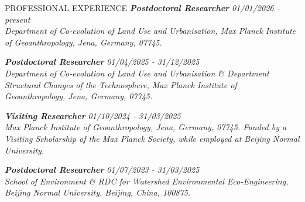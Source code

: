 \documentclass{resume} %
\newcommand{\employmententry}[3]{\textbf{\textit{#1}} \hfill {\em #2} \\ \textnormal{\em #3}}
\begin{document}
\begin{rSection}{PROFESSIONAL EXPERIENCE}
\employmententry{Postdoctoral Researcher}{01/01/2026 - present}{Department of Co-evolution of Land Use and Urbanisation, Max Planck Institute of Geoanthropology, Jena, Germany, 07745.}


\employmententry{Postdoctoral Researcher}{01/04/2025 - 31/12/2025}{Department of Co-evolution of Land Use and Urbanisation \& Department Structural Changes of the Technosphere, Max Planck Institute of Geoanthropology, Jena, Germany, 07745.}



\employmententry{Visiting Researcher}{01/10/2024 - 31/03/2025}
{Max Planck Institute of Geoanthropology, Jena, Germany, 07745. Funded by a Visiting Scholarship of the Max Planck Society, while employed at Beijing Normal University.}

\employmententry{Postdoctoral Researcher}{01/07/2023 - 31/03/2025}
{School of Environment \& RDC for Watershed Environmental Eco-Engineering, Beijing Normal University, Beijing, China, 100875.}


\end{rSection}
\end{document}
